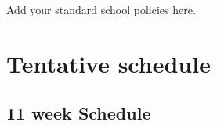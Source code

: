 \documentclass[
  letterpaper,
  DIV=11,
  numbers=noendperiod]{scrreprt}
\begin{document}

Add your standard school policies here.


\hypertarget{tentative-schedule}{%
\chapter*{Tentative schedule}\label{tentative-schedule}}


\hypertarget{week-schedule}{%
\section*{11 week Schedule}\label{week-schedule}}

\end{document}
